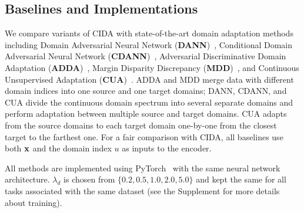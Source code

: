 \documentclass{article}
\begin{document}
\subsection{Baselines and Implementations}
We compare variants of CIDA with state-of-the-art domain adaptation methods including Domain Adversarial Neural Network (\textbf{DANN})~\cite{DANN}, Conditional Domain Adversarial Neural Network (\textbf{CDANN})~\cite{CDANN}, Adversarial Discriminative Domain Adaptation
(\textbf{ADDA})~\cite{ADDA}, Margin Disparity
Discrepancy (\textbf{MDD})~\cite{MDD}, and Continuous Unsupervised Adaptation (\textbf{CUA})~\cite{CUA}.
ADDA and MDD merge data with different domain indices into one source and one target domains; DANN, CDANN, and CUA divide the continuous domain spectrum into several separate domains and perform adaptation between multiple source and target domains. CUA adapts from the source domains to each target domain one-by-one from the closest target to the farthest one.
For a fair comparison with CIDA, all baselines use both ${\bf x}$ and the domain index $u$ as inputs to the encoder.


All methods are implemented using PyTorch~\cite{PyTorch} with the same neural network architecture. $\lambda_d$ is chosen from $\{0.2, 0.5, 1.0, 2.0, 5.0\}$ and kept the same for all tasks associated with the same dataset (see the Supplement for more details about training).
\end{document}

